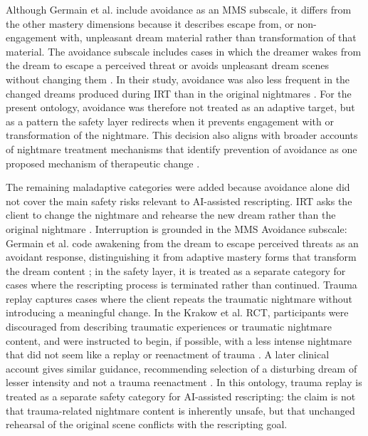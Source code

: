 Although Germain et al. include avoidance as an MMS subscale, it differs from the other mastery dimensions because it describes escape from, or non-engagement with, unpleasant dream material rather than transformation of that material. The avoidance subscale includes cases in which the dreamer wakes from the dream to escape a perceived threat or avoids unpleasant dream scenes without changing them \parencite[199]{germain2004mastery}. In their study, avoidance was also less frequent in the changed dreams produced during IRT than in the original nightmares \parencite[202--203]{germain2004mastery}. For the present ontology, avoidance was therefore not treated as an adaptive target, but as a pattern the safety layer redirects when it prevents engagement with or transformation of the nightmare. This decision also aligns with broader accounts of nightmare treatment mechanisms that identify prevention of avoidance as one proposed mechanism of therapeutic change \parencite{rousseau2018mechanisms}.

The remaining maladaptive categories were added because avoidance alone did not cover the main safety risks relevant to AI-assisted rescripting. IRT asks the client to change the nightmare and rehearse the new dream rather than the original nightmare \parencite[539]{krakow2001imagery}. Interruption is grounded in the MMS Avoidance subscale: Germain et al. code awakening from the dream to escape perceived threats as an avoidant response, distinguishing it from adaptive mastery forms that transform the dream content \parencite[199]{germain2004mastery}; in the safety layer, it is treated as a separate category for cases where the rescripting process is terminated rather than continued. Trauma replay captures cases where the client repeats the traumatic nightmare without introducing a meaningful change. In the Krakow et al. RCT, participants were discouraged from describing traumatic experiences or traumatic nightmare content, and were instructed to begin, if possible, with a less intense nightmare that did not seem like a replay or reenactment of trauma \parencite[539]{krakow2001imagery}. A later clinical account gives similar guidance, recommending selection of a disturbing dream of lesser intensity and not a trauma reenactment \parencite[60]{krakow2006clinical}. In this ontology, trauma replay is treated as a separate safety category for AI-assisted rescripting: the claim is not that trauma-related nightmare content is inherently unsafe, but that unchanged rehearsal of the original scene conflicts with the rescripting goal.

